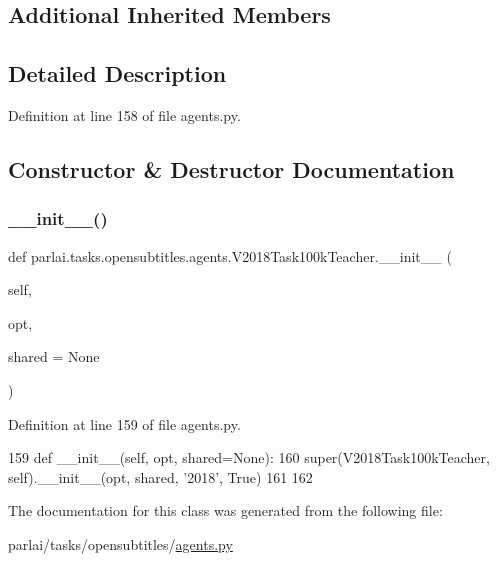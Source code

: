 \subsection*{Additional Inherited Members}


\subsection{Detailed Description}


Definition at line 158 of file agents.\+py.



\subsection{Constructor \& Destructor Documentation}
\mbox{\label{classparlai_1_1tasks_1_1opensubtitles_1_1agents_1_1V2018Task100kTeacher_a7a99a122c49fcc88a4a9f5261a4fefcb}} 
\subsubsection{\texorpdfstring{\+\_\+\+\_\+init\+\_\+\+\_\+()}{\_\_init\_\_()}}
{\footnotesize\ttfamily def parlai.\+tasks.\+opensubtitles.\+agents.\+V2018\+Task100k\+Teacher.\+\_\+\+\_\+init\+\_\+\+\_\+ (\begin{DoxyParamCaption}\item[{}]{self,  }\item[{}]{opt,  }\item[{}]{shared = {\ttfamily None} }\end{DoxyParamCaption})}



Definition at line 159 of file agents.\+py.


\begin{DoxyCode}
159     \textcolor{keyword}{def }\_\_init\_\_(self, opt, shared=None):
160         super(V2018Task100kTeacher, self).\_\_init\_\_(opt, shared, \textcolor{stringliteral}{'2018'}, \textcolor{keyword}{True})
161 
162 
\end{DoxyCode}


The documentation for this class was generated from the following file\+:\begin{DoxyCompactItemize}
\item 
parlai/tasks/opensubtitles/\hyperlink{parlai_2tasks_2opensubtitles_2agents_8py}{agents.\+py}\end{DoxyCompactItemize}
